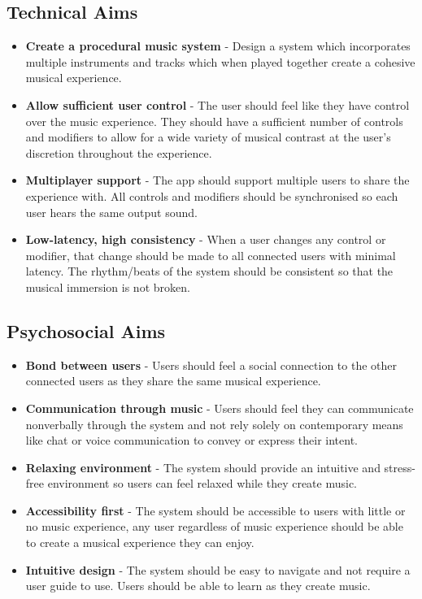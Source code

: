 \subsection{Technical Aims}
\begin{itemize}
    \item
        \textbf{Create a procedural music system} - Design a system which incorporates multiple instruments and tracks which when played together create a cohesive musical experience.
    \item
        \textbf{Allow sufficient user control} - The user should feel like they have control over the music experience. They should have a sufficient number of controls and modifiers to allow for a wide variety of musical contrast at the user’s discretion throughout the experience.
    \item
        \textbf{Multiplayer support} - The app should support multiple users to share the experience with. All controls and modifiers should be synchronised so each user hears the same output sound.
    \item 
        \textbf{Low-latency, high consistency} - When a user changes any control or modifier, that change should be made to all connected users with minimal latency. The rhythm/beats of the system should be consistent so that the musical immersion is not broken.
\end{itemize}

\subsection{Psychosocial Aims}
\begin{itemize}
    \item 
        \textbf{Bond between users} - Users should feel a social connection to the other connected users as they share the same musical experience.
    \item 
        \textbf{Communication through music} - Users should feel they can communicate nonverbally through the system and not rely solely on contemporary means like chat or voice communication to convey or express their intent.
    \item 
        \textbf{Relaxing environment} - The system should provide an intuitive and stress-free environment so users can feel relaxed while they create music.
    \item 
        \textbf{Accessibility first} - The system should be accessible to users with little or no music experience, any user regardless of music experience should be able to create a musical experience they can enjoy.
    \item 
        \textbf{Intuitive design} - The system should be easy to navigate and not require a user guide to use. Users should be able to learn as they create music.
\end{itemize}